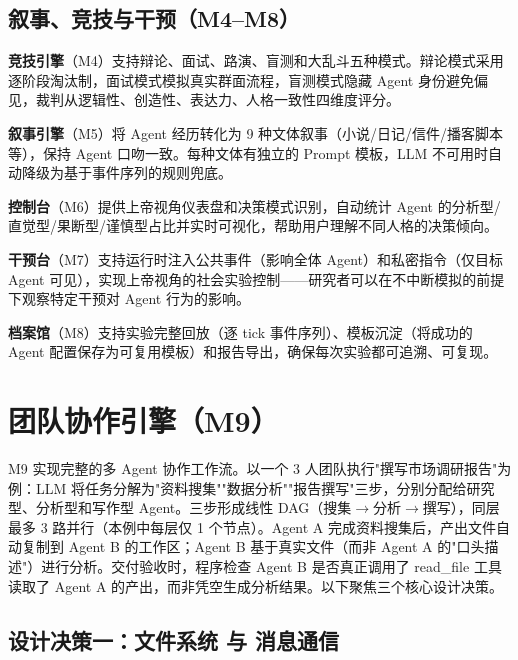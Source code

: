 \documentclass[12pt,a4paper]{article}%
\begin{document}
\subsection{叙事、竞技与干预（M4--M8）}

\textbf{竞技引擎}（M4）支持辩论、面试、路演、盲测和大乱斗五种模式。辩论模式采用逐阶段淘汰制，面试模式模拟真实群面流程，盲测模式隐藏 Agent 身份避免偏见，裁判从逻辑性、创造性、表达力、人格一致性四维度评分。

\textbf{叙事引擎}（M5）将 Agent 经历转化为 9 种文体叙事（小说/日记/信件/播客脚本等），保持 Agent 口吻一致。每种文体有独立的 Prompt 模板，LLM 不可用时自动降级为基于事件序列的规则兜底。

\textbf{控制台}（M6）提供上帝视角仪表盘和决策模式识别，自动统计 Agent 的分析型/直觉型/果断型/谨慎型占比并实时可视化，帮助用户理解不同人格的决策倾向。

\textbf{干预台}（M7）支持运行时注入公共事件（影响全体 Agent）和私密指令（仅目标 Agent 可见），实现上帝视角的社会实验控制——研究者可以在不中断模拟的前提下观察特定干预对 Agent 行为的影响。

\textbf{档案馆}（M8）支持实验完整回放（逐 tick 事件序列）、模板沉淀（将成功的 Agent 配置保存为可复用模板）和报告导出，确保每次实验都可追溯、可复现。


\newpage
\section{团队协作引擎（M9）}

M9 实现完整的多 Agent 协作工作流。以一个 3 人团队执行"撰写市场调研报告"为例：LLM 将任务分解为"资料搜集""数据分析""报告撰写"三步，分别分配给研究型、分析型和写作型 Agent。三步形成线性 DAG（搜集$\to$分析$\to$撰写），同层最多 3 路并行（本例中每层仅 1 个节点）。Agent A 完成资料搜集后，产出文件自动复制到 Agent B 的工作区；Agent B 基于真实文件（而非 Agent A 的"口头描述"）进行分析。交付验收时，程序检查 Agent B 是否真正调用了 read\_file 工具读取了 Agent A 的产出，而非凭空生成分析结果。以下聚焦三个核心设计决策。

\subsection{设计决策一：文件系统 与 消息通信}
\end{document}
